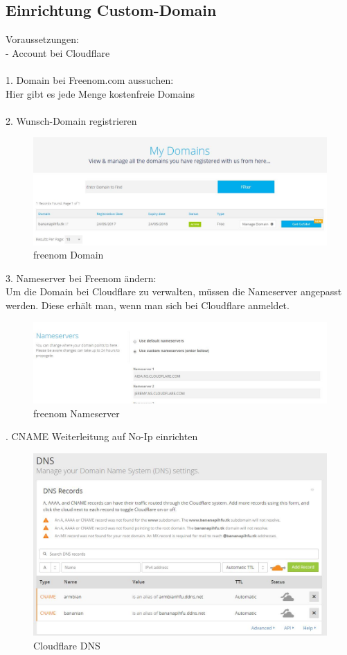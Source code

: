 \subsection{Einrichtung Custom-Domain}
Voraussetzungen:\\
- Account bei Cloudflare\\
~\\
1. Domain bei Freenom.com aussuchen:\\
Hier gibt es jede Menge kostenfreie Domains\\
~\\
2. Wunsch-Domain registrieren\\
\begin{figure}[ht]
\includegraphics[width=\textwidth]{pictures/Jonas/freenom_Domain}
\caption{freenom Domain}
\end{figure}

3. Nameserver bei Freenom ändern:\\
Um die Domain bei Cloudflare zu verwalten, müssen die Nameserver angepasst werden.
Diese erhält man, wenn man sich bei Cloudflare anmeldet.\\
\begin{figure}[ht]
\includegraphics[width=\textwidth]{pictures/Jonas/freenom_Nameserver}
\caption{freenom Nameserver}
\end{figure}
. CNAME Weiterleitung auf No-Ip einrichten\\
\begin{figure}[ht]
\includegraphics[width=\textwidth]{pictures/Jonas/Cloudflare_DNS}
\caption{Cloudflare DNS}
\end{figure}


